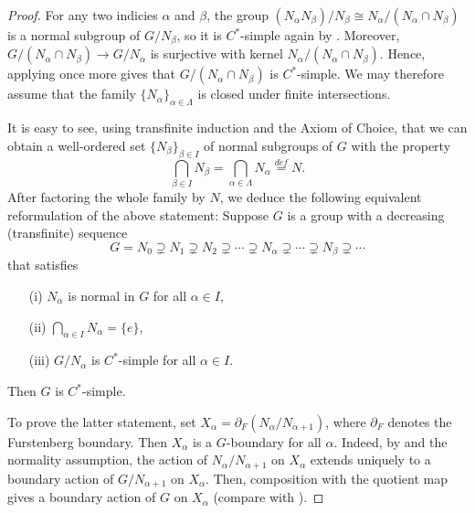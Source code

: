 \documentclass[a4paper]{amsart}
\theoremstyle{plain}
\theoremstyle{definition}
\theoremstyle{remark}
\numberwithin{theorem}{section}
\begin{document}
\begin{proof}
For any two indicies $\alpha$ and $\beta$,
the group $(N_\alpha N_\beta)/N_\beta\cong N_\alpha/(N_\alpha\cap N_\beta)$ is a normal subgroup of $G/N_\beta$,
so it is $C^*$-simple again by \cite[Theorem~1.4]{BKKO}.
Moreover, $G/(N_\alpha\cap N_\beta) \to G/N_\alpha$ is surjective with kernel $N_\alpha/(N_\alpha\cap N_\beta)$.
Hence, applying \cite[Theorem~1.4]{BKKO} once more gives that $G/(N_\alpha\cap N_\beta)$ is $C^*$-simple.
We may therefore assume that the family $\{N_\alpha\}_{\alpha\in\Lambda}$ is closed under finite intersections.

It is easy to see, using transfinite induction and the Axiom of Choice,
that we can obtain a well-ordered set $\{ N_\beta \}_{ \beta \in I }$ of normal subgroups of $G$ with the property
\[
\bigcap_{\beta \in I} N_\beta = \bigcap_{\alpha \in \Lambda} N_\alpha \overset{def}{=} N.
\]
After factoring the whole family by $N$, we deduce the following equivalent reformulation of the above statement:
Suppose $G$ is a group with a decreasing (transfinite) sequence
\[
G=N_0\supsetneq N_1\supsetneq N_2\supsetneq \dotsb \supsetneq N_\alpha \supsetneq \dotsb \supsetneq N_\beta \supsetneq \dotsb
\]
that satisfies
\begin{itemize}
\item[(i)] $N_\alpha$ is normal in $G$ for all $\alpha \in I$,
\item[(ii)] $\bigcap_{\alpha \in I} N_\alpha =\{e\}$,
\item[(iii)] $G/N_\alpha$ is $C^*$-simple for all $\alpha \in I$.
\end{itemize}
Then $G$ is $C^*$-simple.

To prove the latter statement, set $X_\alpha=\partial_F(N_\alpha/N_{\alpha+1})$,
where $\partial_F$ denotes the Furstenberg boundary.
Then $X_\alpha$ is a $G$-boundary for all $\alpha$.
Indeed, by \cite[Lemma~5.2]{BKKO} and the normality assumption,
the action of $N_\alpha/N_{\alpha+1}$ on $X_\alpha$ extends uniquely to a boundary action of $G/N_{\alpha+1}$ on $X_\alpha$.
Then, composition with the quotient map gives a boundary action of $G$ on $X_\alpha$ (compare with \cite[Proof of Theorem~1.4]{BKKO}).


\end{proof}
\end{document}
